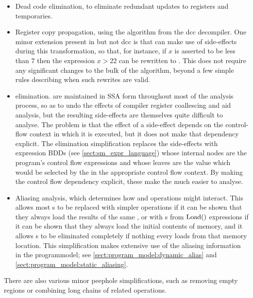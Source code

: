 \begin{itemize}
\item Dead code elimination, to eliminate redundant updates to
  registers and {\StateMachine} temporaries.
\item Register copy propagation, using the algorithm from the
  dcc\needCite{} decompiler.  One minor extension present in
  {\implementation} but not dcc is that {\implementation} can make use
  of  side-effects during this transformation, so that,
  for instance, if $x$ is asserted to be less than $7$ then the
  expression $x > 22$ can be rewritten to \false.  This does not
  require any significant changes to the bulk of the algorithm, beyond
  a few simple rules describing when such rewrites are valid.
\item \state{$\Phi$} elimination.  {\STateMachines} are maintained in
  SSA form throughout most of the analysis process, so as to undo the
  effects of compiler register coallescing and aid analysis, but the
  resulting \state{$\Phi$} side-effects are themselves quite difficult
  to analyse.  The problem is that the effect of a \state{$\Phi$}
  side-effect depends on the control-flow context in which it is
  executed, but it does not make that dependency explicit.  The
  \state{$\Phi$} elimination simplification replaces the
  \state{$\Phi$} side-effects with expression BDDs (see
  \autoref{sect:sm_expr_language}) whose internal nodes are the
  program's control flow expressions and whose leaves are the value
  which would be selected by the \state{$\Phi$} in the appropriate
  control flow context.  By making the control flow dependency
  explicit, these make the \state{$\Phi$} much easier to analyse.
\item Aliasing analysis, which determines how  and
   operations might interact.  This allows most
  s to be replaced with simpler  operations if
  it can be shown that they always load the results of the same
  , or with s from $\mathrm{Load}()$ expressions if
  it can be shown that they always load the initial contents of
  memory, and it allows s to be eliminated completely if
  nothing every loads from that memory location.  This simplification
  makes extensive use of the aliasing information in the
  \gls{programmodel}; see \autoref{sect:program_model:dynamic_alias}
  and \autoref{sect:program_model:static_aliasing}.
\end{itemize}

There are also various minor peephole simplifications, such as
removing empty  regions or combining long chains of
related  operations.

